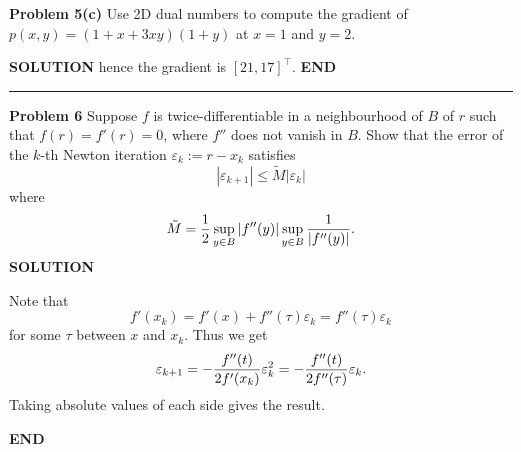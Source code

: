 \documentclass[12pt,a4paper]{article}
\begin{document}
\textbf{Problem 5(c)} Use 2D dual numbers to compute the gradient of $p(x,y) = (1 + x + 3xy)(1+y)$ at $x=1$ and $y=2$.

\textbf{SOLUTION}
hence the gradient is $[21,17]^\ensuremath{\top}$. \textbf{END}

\rule{\textwidth}{1pt}
\textbf{Problem 6} Suppose $f$ is twice-differentiable in a neighbourhood of $B$ of $r$ such that $f(r) = f'(r) = 0$, where $f''$ does not vanish in $B$. Show  that the error of the $k$-th Newton iteration $\ensuremath{\varepsilon}_k := r - x_k$ satisfies
\[
|\ensuremath{\varepsilon}_{k+1}| \ensuremath{\leq} \tilde{M} |\ensuremath{\varepsilon}_k|
\]
where 
\[
\tilde{M} ={1 \over 2} \sup_{y \in B} |f''(y)|  \sup_{y \in B} {1 \over |f''(y)|}.
\]
\textbf{SOLUTION}

Note that
\[
f'(x_k) = f'(x) + f''(\ensuremath{\tau}) \ensuremath{\varepsilon}_k = f''(\ensuremath{\tau}) \ensuremath{\varepsilon}_k
\]
for some $\ensuremath{\tau}$ between $x$ and $x_k$.  Thus we get
\[
\ensuremath{\varepsilon}_{k+1}  = -{f''(t) \over 2f'(x_k)} \ensuremath{\varepsilon}_k^2 = -{f''(t) \over 2f''(\ensuremath{\tau})} \ensuremath{\varepsilon}_k.
\]
Taking absolute values of each side gives the result.

\textbf{END}
\end{document}
